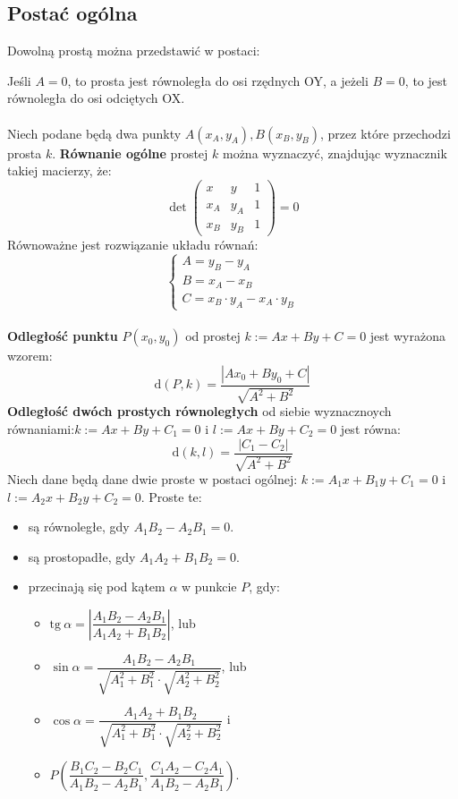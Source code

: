 \documentclass[14pt,a4paper]{extarticle}
\newcommand{\scalemath}[2][4]{\scalebox{#1}{\ensuremath{#2}}}
\newcommand{\verts}[1]{\left\lvert#1\right\rvert}
\begin{document}
\subsection*{Postać ogólna}
Dowolną prostą można przedstawić w postaci:
\begin{center}\scalemath[1.3]{$$Ax+By+C=0;\;\; A, B, C \in \mathbb{R},\;\;A \lor B \neq 0$$}\end{center}
Jeśli $A=0$, to prosta jest równoległa do osi rzędnych OY, a jeżeli $B=0$, to jest równoległa do
osi odciętych OX.
\\\\
\noindent Niech podane będą dwa punkty $A(x_{A}, y_{A}), B(x_{B}, y_{B})$, przez które przechodzi prosta $k$. \textbf{Równanie ogólne} prostej
$k$ można wyznaczyć, znajdując wyznacznik takiej macierzy, że:
$$\det\begin{pmatrix}x & y & 1\\x_{A} & y_{A} & 1\\x_{B} & y_{B} & 1\end{pmatrix} = 0$$
Równoważne jest rozwiązanie układu równań:
\begin{equation*}
   \left\{
      \begin{array}{l}
         A = y_{B} - y_{A}\\
         B = x_{A} - x_{B}\\
         C = x_{B}\cdot y_{A} - x_{A}\cdot y_{B}
      \end{array}
   \right.
\end{equation*}
\hfill\break\\
\noindent \textbf{Odległość punktu} $P(x_{0}, y_{0})$ od prostej $k\!:=Ax+By+C=0$ jest wyrażona wzorem:
$$\text{d}(P, k) = \dfrac{\verts{Ax_{0}+By_{0}+C}}{\sqrt{A^{2}+B^{2}}}$$
\noindent \textbf{Odległość dwóch prostych równoległych} od siebie wyznacznoych równaniami:\break $k\!:=Ax+By+C_{1}=0$ i $l\!:=Ax+By+C_{2}=0$
jest równa:
$$\text{d}(k, l) = \dfrac{\verts{C_{1}-C_{2}}}{\sqrt{A^{2}+B^{2}}}$$
\noindent Niech dane będą dane dwie proste w postaci ogólnej: $k\!:=A_{1}x+B_{1}y+C_{1}=0$ i $l\!:=A_{2}x+B_{2}y+C_{2}=0$.
Proste te:
\begin{itemize}
   \item są równoległe, gdy $A_{1}B_{2}-A_{2}B_{1} = 0$.
   \item są prostopadłe, gdy $A_{1}A_{2}+B_{1}B_{2} = 0$.
   \item przecinają się pod kątem $\alpha$ w punkcie $P$, gdy:
   \begin{itemize}
      \item $\text{tg}\:\alpha=\verts{\dfrac{A_{1}B_{2}-A_{2}B_{1}}{A_{1}A_{2}+B_{1}B_{2}}}$, lub
      \item $\sin\alpha=\dfrac{A_{1}B_{2}-A_{2}B_{1}}{\sqrt{A_{1}^{2}+B_{1}^{2}}\cdot\sqrt{A_{2}^{2}+B_{2}^{2}}}$, lub
      \item $\cos\alpha=\dfrac{A_{1}A_{2}+B_{1}B_{2}}{\sqrt{A_{1}^{2}+B_{1}^{2}}\cdot\sqrt{A_{2}^{2}+B_{2}^{2}}}$ i
      \item $P\left(\dfrac{B_{1}C_{2}-B_{2}C_{1}}{A_{1}B_{2}-A_{2}B_{1}},\dfrac{C_{1}A_{2}-C_{2}A_{1}}{A_{1}B_{2}-A_{2}B_{1}}\right)$.      
   \end{itemize}
\end{itemize}
\end{document}
